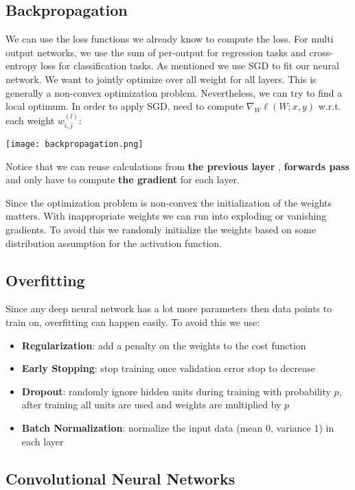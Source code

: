 \subsection{Backpropagation}

We can use the loss functions we already know to compute the loss. For multi output networks, we use the sum of per-output for regression tasks and cross-entropy loss for classification tasks. As mentioned we use SGD to fit our neural network. We want to jointly optimize over all weight for all layers. This is generally a non-convex optimization problem. Nevertheless, we can try to find a local optimum. In order to apply SGD, need to compute $\nabla_W \ell(W; x, y)$ w.r.t. each weight $w_{i,j}^{(l)}$:

\texttt{[image: backpropagation.png]}

Notice that we can reuse calculations from \color{ForestGreen} \textbf{the previous layer} \color{Black}, \color{ProcessBlue} \textbf{forwards pass} \color{Black} and only have to compute \color{Red} \textbf{the gradient} \color{Black} for each layer.

Since the optimization problem is non-convex the initialization of the weights matters. With inappropriate weights we can run into exploding or vanishing gradients. To avoid this we randomly initialize the weights based on some distribution assumption for the activation function.

\subsection{Overfitting}

Since any deep neural network has a lot more parameters then data points to train on, overfitting can happen easily. To avoid this we use:
\begin{itemize}
	\item \textbf{Regularization}: add a penalty on the weights to the cost function
	\item \textbf{Early Stopping}: stop training once validation error stop to decrease
	\item \textbf{Dropout}: randomly ignore hidden units during training with probability $p$, after training all units are used and weights are multiplied by $p$
	\item \textbf{Batch Normalization}: normalize the input data (mean 0, variance 1) in each layer
\end{itemize}

\subsection{Convolutional Neural Networks}

